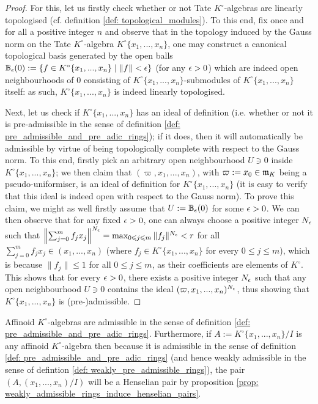                 \begin{proof}
                    For this, let us firstly check whether or not Tate $K^{\circ}$-algebras are linearly topologised (cf. definition \ref{def: topological_modules}). To this end, fix once and for all a positive integer $n$ and observe that in the topology induced by the Gauss norm on the Tate $K^{\circ}$-algebra $K^{\circ}\{x_1, ..., x_n\}$, one may construct a canonical topological basis generated by the open balls $\mathbb{B}_{\epsilon}(0) := \{f \in K^{\circ}\{x_1, ..., x_n\} \mid \|f\| < \epsilon\}$ (for any $\epsilon > 0$) which are indeed open neighbourhoods of $0$ consisting of $K^{\circ}\{x_1, ..., x_n\}$-submodules of $K^{\circ}\{x_1, ..., x_n\}$ itself: as such, $K^{\circ}\{x_1, ..., x_n\}$ is indeed linearly topologised. 
                
                    Next, let us check if $K^{\circ}\{x_1, ..., x_n\}$ has an ideal of definition (i.e. whether or not it is pre-admissible in the sense of definition \ref{def: pre_admissible_and_pre_adic_rings}); if it does, then it will automatically be admissible by virtue of being topologically complete with respect to the Gauss norm.  To this end, firstly pick an arbitrary open neighbourhood $U \ni 0$ inside $K^{\circ}\{x_1, ..., x_n\}$; we then claim that $(\varpi, x_1, ..., x_n)$, with $\varpi := x_0 \in \mathfrak{m}_K$ being a pseudo-uniformiser, is an ideal of definition for $K^{\circ}\{x_1, ..., x_n\}$ (it is easy to verify that this ideal is indeed open with respect to the Gauss norm). To prove this claim, we might as well firstly assume that $U := \mathbb{B}_{\epsilon}(0)$ for some $\epsilon > 0$. We can then observe that for any fixed $\epsilon > 0$, one can always choose a positive integer $N_{\epsilon}$ such that $\left\| \sum_{j = 0}^m f_j x_j \right\|^{N_{\epsilon}} = \max_{0 \leqslant j \leqslant m} \|f_j\|^{N_{\epsilon}} < r$ for all $\sum_{j = 0}^m f_j x_j \in (x_1, ..., x_n)$ (where $f_j \in K^{\circ}\{x_1, ..., x_n\}$ for every $0 \leq j \leq m$), which is because $\|f_j\| \leq 1$ for all $0 \leq j \leq m$, as their coefficients are elements of $K^{\circ}$. This shows that for every $\epsilon > 0$, there exists a positive integer $N_{\epsilon}$ such that any open neighbourhood $U \ni 0$ contains the ideal $(\varpi, x_1, ..., x_n)^{N_{\epsilon}}$, thus showing that $K^{\circ}\{x_1, ..., x_n\}$ is (pre-)admissible. 
                \end{proof}
            \begin{corollary} \label{coro: affinoid_algebras_over_valuation_rings_are_topologically_pre_admissible}
                Affinoid $K^{\circ}$-algebras are admissible in the sense of definition \ref{def: pre_admissible_and_pre_adic_rings}. Furthermore, if $A := K^{\circ}\{x_1, ..., x_n\}/I$ is any affinoid $K^{\circ}$-algebra then because it is admissible in the sense of definition \ref{def: pre_admissible_and_pre_adic_rings} (and hence weakly admissible in the sense of defintion \ref{def: weakly_pre_admissible_rings}), the pair $(A, (x_1, ..., x_n)/I)$ will be a Henselian pair by proposition \ref{prop: weakly_admissible_rings_induce_henselian_pairs}.
            \end{corollary}
